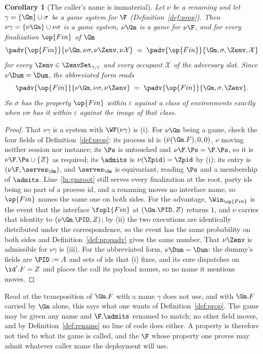 \documentclass[10pt,oneside,openany]{book}
\theoremstyle{accentdef}
\theoremstyle{accentplain}
\newtheorem{corollary}[definition]{Corollary}
\begin{document}
\begin{corollary}[The caller's name is immaterial]\label{cor:callername}
Let $\nu$ be a renaming and let $\gamma = \{\Gm\} \cup \sigma$ be a game system for $\F$
(Definition~\ref{def:prop}). Then $\nu\gamma = \{\nu\Gm\} \cup \nu\sigma$ is a game system, $\nu\Gm$ is
a game for $\nu\F$, and for every finalization $\op{Fin}$ of $\Gm$
\[
  \padv{\op{Fin}}{\nu\Gm,\nu\sigma,\nu\Zenv,\nu\mathcal{X}}
  \;=\;
  \padv{\op{Fin}}{\Gm,\sigma,\Zenv,\mathcal{X}}
\]
for every $\Zenv \in \ZenvSet_{\gamma,\gamma}$ and every occupant $\mathcal{X}$ of the adversary slot.
Since $\nu\Dum = \Dum$, the abbreviated form reads
\[
  \padv{\op{Fin}}{\nu\Gm,\nu\sigma,\nu\Zenv} \;=\; \padv{\op{Fin}}{\Gm,\sigma,\Zenv} .
\]
So $\sigma$ has the property $\op{Fin}$ within $\varepsilon$ against a class of environments exactly
when $\nu\sigma$ has it within $\varepsilon$ against the image of that class.
\end{corollary}

\begin{proof}
That $\nu\gamma$ is a system with $\WF(\nu\gamma)$ is (i). For $\nu\Gm$ being a game,
check the four fields of Definition~\ref{def:prop}: its process id is
$(\bar\nu(\Gm.F),0,0)$, $\nu$ moving neither session nor instance; its $\Ps$ is untouched and
$\nu\F.\Ps = \F.\Ps$, so it is $\nu\F.\Ps \cup \{Z\}$ as required; its $\admits$ is
$\nu(\Zpid) = \Zpid$ by (i); its entry is $(\nu\F,\serves_{\Gm})$, and $\serves_{\Gm}$ is equivariant,
reading $\Ps$ and a membership of $\admits$. Line~\ref{ln:gmroot} still serves every finalization at
the
root, party ids being no part of a process id, and a renaming moves no interface name, so $\op{Fin}$
names the same one on both sides. For the advantage, $\Win_{\op{Fin}}$ is the event that the
interface $\fopl{Fin}$
at $(\Gm.\PID,Z)$ returns $1$, and $\nu$ carries that identity to $(\nu\Gm.\PID,Z)$; by (ii)
the two executions are identically distributed under the correspondence, so the event has the same
probability on both sides and Definition~\ref{def:propadv} gives the same number. That
$\nu\Zenv$ is admissible for $\nu\gamma$ is (iii). For the abbreviated form, $\nu\Dum = \Dum$: the
dummy's fields are $\PID := A$ and sets of ids that (i) fixes, and its core dispatches on
$\id'.F = Z$ and places the call its payload names, so no name it mentions moves.
\end{proof}

Read at the transposition of $\Gm.F$ with a name $\gamma$ does not use, and with $\Gm.F$ carried by
$\Gm$ alone, this says what one wants of Definition~\ref{def:prop}. The game may be given any name and
$\F.\admits$ renamed to match; no other field moves, and by Definition~\ref{def:rename} no line of
code does either. A property is therefore not tied to what its game is called, and the $\F$ whose
property one proves may admit whatever caller name the deployment will use.
\end{document}
